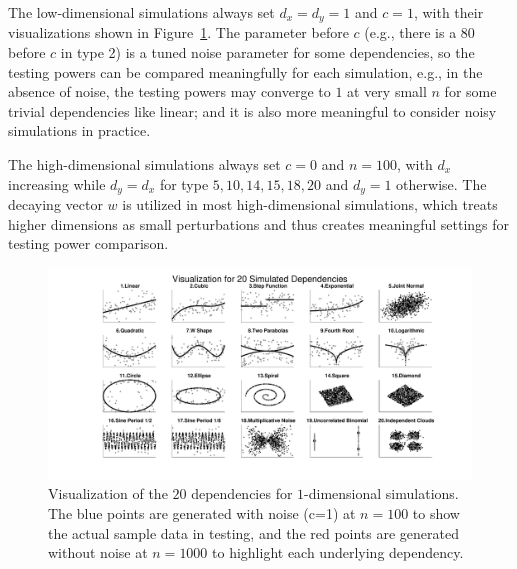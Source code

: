 \documentclass[11pt]{article}
\begin{document}
The low-dimensional simulations always set $d_{x}=d_{y}=1$ and $c=1$, with their visualizations shown in Figure~\ref{fig0}. The parameter before $c$ (e.g., there is a $80$ before $c$ in type 2) is a tuned noise parameter for some dependencies, so the testing powers can be compared meaningfully for each simulation, e.g., in the absence of noise, the testing powers may converge to $1$ at very small $n$ for some trivial dependencies like linear; and it is also more meaningful to consider noisy simulations in practice. 

The high-dimensional simulations always set $c=0$ and $n=100$, with $d_{x}$ increasing while $d_{y}=d_{x}$ for type $5,10,14,15,18,20$ and $d_{y}=1$ otherwise. The decaying vector $w$ is utilized in most high-dimensional simulations, which treats higher dimensions as small perturbations and thus creates meaningful settings for testing power comparison. %

\begin{figure}[htbp]
\includegraphics[trim={5cm 0 3.5cm 0},clip, width=1.0\textwidth]{Figures/FigSimVisual}
\caption{Visualization of the $20$ dependencies for $1$-dimensional simulations. The blue points are generated with noise (c=1) at $n=100$ to show the actual sample data in testing, and the red points are generated without noise at $n=1000$ to highlight each underlying dependency.
}
\label{fig0}
\end{figure}
\end{document}
